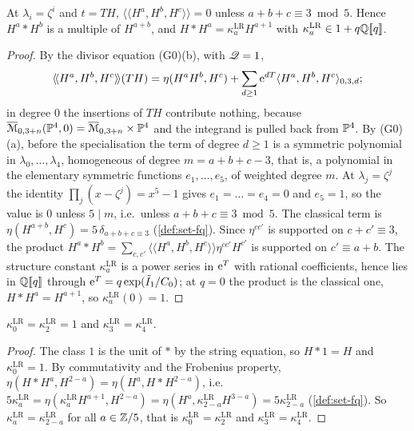 \begin{lem}
\label{lem:set-grading}
At $\lambda_i=\zeta^i$ and $t=TH$, $\langle\!\langle H^a,H^b,H^c\rangle\!\rangle=0$ unless $a+b+c\equiv3\bmod5$. Hence $H^a*H^b$ is a multiple of $H^{a+b}$, and $H*H^a=\kappa^{\mathrm{LR}}_aH^{a+1}$ with $\kappa^{\mathrm{LR}}_a\in1+q\mathbb{Q}[\![ q ]\!]$.
\end{lem}

\begin{proof}
By the divisor equation (G0)(b), with $\mathscr{Q}=1$,
\[
\langle\!\langle H^a,H^b,H^c\rangle\!\rangle(TH)=\eta(H^aH^b,H^c)+\sum_{d\geq1}\mathrm{e}^{dT}\langle H^a,H^b,H^c\rangle_{0,3,d};
\]
in degree $0$ the insertions of $TH$ contribute nothing, because $\overline{\mathcal M}_{0,3+n}(\mathbb{P}^4,0)=\overline{\mathcal M}_{0,3+n}\times\mathbb{P}^4$ and the integrand is pulled back from $\mathbb{P}^4$. By (G0)(a), before the specialisation the term of degree $d\geq1$ is a symmetric polynomial in $\lambda_0,\dots,\lambda_4$, homogeneous of degree $m=a+b+c-3$, that is, a polynomial in the elementary symmetric functions $e_1,\dots,e_5$, of weighted degree $m$. At $\lambda_j=\zeta^j$ the identity $\prod_j(x-\zeta^j)=x^5-1$ gives $e_1=\dots=e_4=0$ and $e_5=1$, so the value is $0$ unless $5\mid m$, i.e.\ unless $a+b+c\equiv3\bmod5$. The classical term is $\eta(H^{a+b},H^c)=5\,\delta_{a+b+c\equiv3}$ (\cref{def:set-fq}). Since $\eta^{cc'}$ is supported on $c+c'\equiv3$, the product $H^a*H^b=\sum_{c,c'}\langle\!\langle H^a,H^b,H^c\rangle\!\rangle\eta^{cc'}H^{c'}$ is supported on $c'\equiv a+b$. The structure constant $\kappa^{\mathrm{LR}}_a$ is a power series in $\mathrm{e}^T$ with rational coefficients, hence lies in $\mathbb{Q}[\![ q ]\!]$ through $\mathrm{e}^T=q\exp(\tilde I_1/C_0)$; at $q=0$ the product is the classical one, $H*H^a=H^{a+1}$, so $\kappa^{\mathrm{LR}}_a(0)=1$.
\end{proof}

\begin{lem}
\label{lem:set-unitfrob}
$\kappa^{\mathrm{LR}}_0=\kappa^{\mathrm{LR}}_2=1$ and $\kappa^{\mathrm{LR}}_3=\kappa^{\mathrm{LR}}_4$.
\end{lem}

\begin{proof}
The class $1$ is the unit of $*$ by the string equation, so $H*1=H$ and $\kappa^{\mathrm{LR}}_0=1$. By commutativity and the Frobenius property, $\eta(H*H^a,H^{2-a})=\eta(H^a,H*H^{2-a})$, i.e.\ $5\kappa^{\mathrm{LR}}_a=\eta(\kappa^{\mathrm{LR}}_aH^{a+1},H^{2-a})=\eta(H^a,\kappa^{\mathrm{LR}}_{2-a}H^{3-a})=5\kappa^{\mathrm{LR}}_{2-a}$ (\cref{def:set-fq}). So $\kappa^{\mathrm{LR}}_a=\kappa^{\mathrm{LR}}_{2-a}$ for all $a\in\mathbb{Z}/5$, that is $\kappa^{\mathrm{LR}}_0=\kappa^{\mathrm{LR}}_2$ and $\kappa^{\mathrm{LR}}_3=\kappa^{\mathrm{LR}}_4$.
\end{proof}


